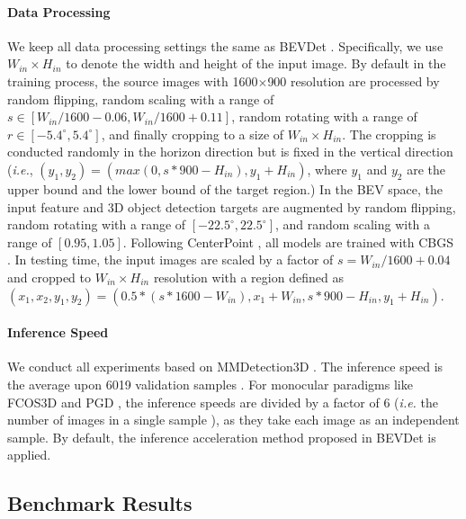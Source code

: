 \documentclass[10pt,twocolumn,letterpaper]{article}
\begin{document}
\paragraph{Data Processing} We keep all data processing settings the same as BEVDet \cite{BEVDet}. Specifically, we use $W_{in}\times H_{in}$ to denote the width and height of the input image. By default in the training process, the source images with 1600$\times$900 resolution \cite{NS} are processed by random flipping, random scaling with a range of $s\in[W_{in}/1600-0.06, W_{in}/1600+0.11]$, random rotating with a range of $r\in[-5.4^{\circ}, 5.4^{\circ}]$, and finally cropping to a size of $W_{in}\times H_{in}$. The cropping is conducted randomly in the horizon direction but is fixed in the vertical direction (\textit{i.e.}, $(y_1,y_2) =(max(0,s*900 - H_{in}), y_1+H_{in})$, where $y_1$ and $y_2$ are the upper bound and the lower bound of the target region.) In the BEV space, the input feature and 3D object detection targets are augmented by random flipping, random rotating with a range of $[-22.5^{\circ}, 22.5^{\circ}]$, and random scaling with a range of $[0.95, 1.05]$. Following CenterPoint \cite{CenterPoint3D}, all models are trained with CBGS \cite{CBGS}. In testing time, the input images are scaled by a factor of $s=W_{in}/1600+0.04$ and cropped to $W_{in}\times H_{in}$ resolution with a region defined as $(x_1,x_2,y_1,y_2)=(0.5*(s*1600-W_{in}), x_1+W_{in}, s*900-H_{in}, y_1+H_{in})$.

\paragraph{Inference Speed} We conduct all experiments based on MMDetection3D \cite{mmdet3d2020}. The inference speed is the average upon 6019 validation samples \cite{NS}. For monocular paradigms like FCOS3D \cite{FCOS3D} and PGD \cite{PGD}, the inference speeds are divided by a factor of 6 (\textit{i.e.} the number of images in a single sample \cite{NS}), as they take each image as an independent sample. By default, the inference acceleration method proposed in BEVDet \cite{BEVDet} is applied.







\subsection{Benchmark Results}
\end{document}
